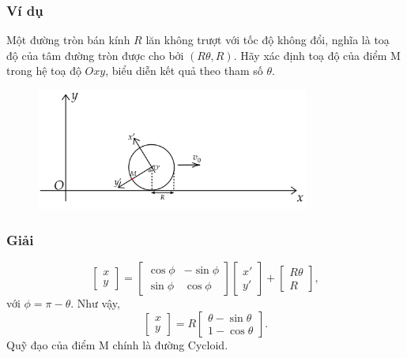 \begin{frame}
    \frametitle{Ví dụ}
    Một đường tròn bán kính \(R\) lăn không trượt với tốc độ không đổi, nghĩa là toạ độ của tâm đường tròn được cho bởi \((R\theta,R)\). Hãy xác định toạ độ của điểm M trong hệ toạ độ \(Oxy\), biểu diễn kết quả theo tham số \(\theta\).
\begin{figure}[H]
    \centering
    \includegraphics[width=9cm, height=4cm]{Slides/Figure/cycloidexample.png}
\end{figure}
\end{frame}
\begin{frame}
    \frametitle{Giải}
\[\begin{bmatrix}
    x\\y
\end{bmatrix}=\begin{bmatrix}
    \cos\phi&-\sin\phi \\\sin\phi&\cos\phi
\end{bmatrix}\begin{bmatrix}
    x'\\y'
\end{bmatrix}+\begin{bmatrix}
    R\theta\\R
\end{bmatrix},\] với \(\phi=\pi-\theta.\) Như vậy, 
\[\begin{bmatrix}
    x\\y
\end{bmatrix}=R\begin{bmatrix}
    \theta-\sin\theta\\1-\cos\theta
\end{bmatrix}.\] Quỹ đạo của điểm M chính là đường Cycloid.
\end{frame}
